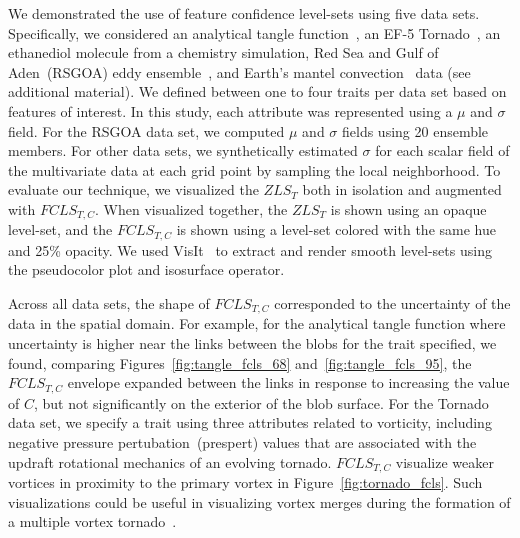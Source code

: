 %


%
%
We demonstrated the use of feature confidence level-sets using five data sets.
%
Specifically, we considered an analytical tangle function~\cite{knoll2009fast}, an EF-5 Tornado~\cite{atmos10100578}, an ethanediol molecule from a chemistry simulation, Red Sea and Gulf of Aden~(RSGOA) eddy ensemble~\cite{sanikommu2020impact}, and Earth's mantel convection~\cite{shahnas2017mid} data (see additional material).
%
We defined between one to four traits per data set based on features of interest. 
%
%
In this study, each attribute was represented using a ${\mu}$ and ${\sigma}$ field. 
%
For the RSGOA data set, we computed ${\mu}$ and ${\sigma}$ fields using 20 ensemble members. 
%
For other data sets, we synthetically estimated ${\sigma}$ for each scalar field of the multivariate data at each grid point by sampling the local neighborhood.
%
To evaluate our technique, we visualized the $ZLS_{T}$ both in isolation and augmented with $FCLS_{T,C}$. 
%
When visualized together, the $ZLS_{T}$ is shown using an opaque level-set, and the $FCLS_{T,C}$ is shown using a level-set colored with the same hue and 25\% opacity.
%
We used VisIt~\cite{childs2012visit} to extract and render smooth level-sets using the pseudocolor plot and isosurface operator.

%

%
%
Across all data sets, the shape of $FCLS_{T,C}$ corresponded to the uncertainty of the data in the spatial domain.
%
For example, for the analytical tangle function where uncertainty is higher near the links between the blobs for the trait specified, we found, comparing Figures~\ref{fig:tangle_fcls_68} and~\ref{fig:tangle_fcls_95}, the $FCLS_{T,C}$ envelope expanded between the links in response to increasing the value of $C$, but not significantly on the exterior of the blob surface.
%
For the Tornado data set, we specify a trait using three attributes related to vorticity, including negative pressure pertubation~(prespert) values that are associated with the updraft rotational mechanics of an evolving tornado. 
%
$FCLS_{T,C}$ visualize weaker vortices in proximity to the primary vortex in Figure~\ref{fig:tornado_fcls}.
%
Such visualizations could be useful in visualizing vortex merges during the formation of a multiple vortex tornado~\cite{atmos10100578}. 
%

